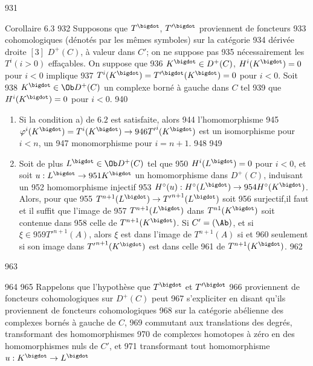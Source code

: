    931	\begin{enonce*}{Corollaire 6.3}
   932	Supposons que $T^{\bigdot}$, ${T'^{\bigdot}}$ proviennent de foncteurs
   933	cohomologiques (dénotés par les mêmes symboles) sur la catégorie
   934	dérivée droite $[3]$ $D^{+}(C)$, à valeur dans $C'$; on ne suppose pas
   935	nécessairement les $T^{i}(i>0)$ effaçables. On suppose que
   936	$K^{\bigdot}\in D^{+}(C)$, $H^{i}(K^{\bigdot})=0$ pour $i<0$ implique 
   937	$T^{i}(K^{\bigdot})=T'^{\bigdot}(K^{\bigdot})=0$ pour $i<0$. Soit
   938	$K^{\bigdot}\in \Ob D^{+}(C)$ un complexe borné à gauche dans $C$ tel
   939	que $H^{i}(K^{\bigdot})=0$ pour $i<0$.
   940	\begin{enumerate}
   941	\renewcommand{\theenumi}{\roman{enumi}}
   942	\renewcommand{\labelenumi}{(\theenumi)}
   943	\item Si la condition {\rm a)} de $6.2$ est satisfaite, alors
   944	  l'homomorphisme
   945	  $\varphi^{i}(K^{\bigdot})=T^{i}(K^{\bigdot})\rightarrow
   946	  {T'}^{i}(K^{\bigdot})$ est un isomorphisme pour $i<n$, un
   947	  monomorphisme pour $i=n+1$.
   948	
   949	\item Soit de plus $L^{\bigdot}\in \Ob D^{+}(C)$ tel que
   950	  $H^{i}(L^{\bigdot})=0$ pour $i<0$, et soit $u:L^{\bigdot}\rightarrow
   951	  K^{\bigdot}$ un homomorphisme dans $D^{+}(C)$, induisant un
   952	  homomorphisme injectif
   953	  $H^{\circ}(u):H^{\circ}(L^{\bigdot})\rightarrow
   954	  H^{\circ}(K^{\bigdot})$. Alors, pour que
   955	  $T^{n+1}(L^{\bigdot})\rightarrow {T'}^{n+1}(L^{\bigdot})$ soit
   956	  surjectif,\pageoriginale il faut et il suffit que l'image de
   957	  $T^{n+1}(L^{\bigdot})$ dans $T^{n1}(K^{\bigdot})$ soit contenue dans
   958	  celle de $T^{n+1}(K^{\bigdot})$. Si $C'=(\Ab)$, et si $\xi \in
   959	  {T'}^{n+1}(A)$, alors $\xi$ est dans l'image de $T^{n+1}(A)$ si et
   960	  seulement si son image dans ${T'}^{n+1}(K^{\bigdot})$ est dans celle
   961	  de $T^{n+1}(K^{\bigdot})$.
   962	\end{enumerate}
   963	\end{enonce*}
   964	
   965	Rappelons que l'hypothèse que $T^{\bigdot}$ et $T'^{\bigdot}$
   966	proviennent de foncteurs cohomologiques sur $D^{+}(C)$ peut
   967	s'expliciter en disant qu'ils proviennent de foncteurs cohomologiques
   968	sur la catégorie abélienne des complexes bornés à gauche de $C$,
   969	commutant aux translations des degrés, transformant des homomorphismes
   970	de complexes homotopes à zéro en des homomorphismes nuls de $C'$, et
   971	transformant tout homomorphisme $u:K^{\bigdot}\rightarrow L^{\bigdot}$
